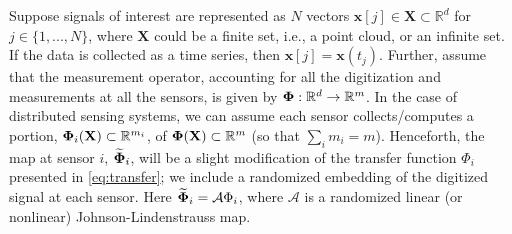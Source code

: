 Suppose signals of interest are represented as $N$ vectors $\mathbf{x}[j] \in \mathbf{X}\subset \mathbb{R}^d$ %
for $j\in\{1,...,N\}$,
where $\mathbf{X}$ could be a finite set, i.e., a
point cloud, or an infinite set.
If the data is collected as a time series, then $\mathbf{x}[j] = \mathbf{x}(t_j)$.
Further, assume that the measurement operator, accounting for all the digitization and measurements at all the sensors, is given by $\mathbf{\Phi}:\mathbb{R}^d \to \mathbb{R}^m$.  
In the case of distributed sensing systems, we can assume each sensor collects/computes a portion, $\mathbf{\Phi}_i (\mathbf{X}) \subset \mathbb{R}^{m_i}$, of $\mathbf{\Phi}( \mathbf{X}) \subset \mathbb{R}^m$ (so that $\sum_i{m_i}=m$).
Henceforth, the map at sensor $i$, $\widetilde{\mathbf{\Phi}}_i$, will be a slight modification of the transfer function $\Phi_i$ presented in \eqref{eq:transfer}; we include a randomized embedding of the digitized signal at each sensor. Here $\widetilde{\mathbf{\Phi}}_i = \mathcal{A}\Phi_i$, where $\mathcal{A}$ is a randomized linear (or nonlinear) Johnson-Lindenstrauss map.
%
%
